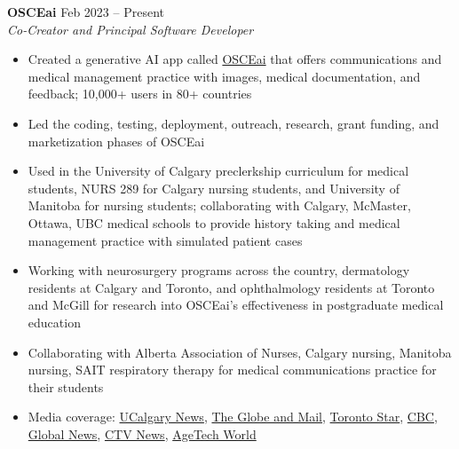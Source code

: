 \documentclass{article}
\begin{document}
\textbf{OSCEai} \hfill Feb 2023 -- Present \\
\textit{Co-Creator and Principal Software Developer}
\begin{itemize}
    \item Created a generative AI app called \href{https://osceai.ca/}{OSCEai} that offers communications and medical management practice with images, medical documentation, and feedback; 10,000+ users in 80+ countries
    \item Led the coding, testing, deployment, outreach, research, grant funding, and marketization phases of OSCEai
    \item Used in the University of Calgary preclerkship curriculum for medical students, NURS 289 for Calgary nursing students, and University of Manitoba for nursing students; collaborating with Calgary, McMaster, Ottawa, UBC medical schools to provide history taking and medical management practice with simulated patient cases
    \item Working with neurosurgery programs across the country, dermatology residents at Calgary and Toronto, and ophthalmology residents at Toronto and McGill for research into OSCEai's effectiveness in postgraduate medical education
    \item Collaborating with Alberta Association of Nurses, Calgary nursing, Manitoba nursing, SAIT respiratory therapy for medical communications practice for their students
    \item Media coverage: \href{https://cumming.ucalgary.ca/news/ucalgary-students-create-app-help-medical-students-learn-how-talk-patients}{UCalgary News}, \href{https://www.theglobeandmail.com/canada/alberta/article-new-app-uses-ai-to-help-calgary-medical-students-practise-interacting/}{The Globe and Mail}, \href{https://www.thestar.com/news/canada/new-app-uses-ai-to-help-calgary-medical-students-practise-interacting-with-patients/article_e24a869c-58f4-58ee-99ea-666e2bc65f27.amp.html}{Toronto Star}, \href{https://www.cbc.ca/amp/1.6975645}{CBC}, \href{https://globalnews.ca/news/9978614/new-app-uses-ai-medical-students-practise-interacting-patients/}{Global News}, \href{https://calgary.ctvnews.ca/new-app-uses-ai-to-help-calgary-medical-students-practise-interacting-with-patients-1.6573065?utm_source=ground.news&utm_medium=referral}{CTV News}, \href{https://agetechworld-co-uk.cdn.ampproject.org/c/s/agetechworld.co.uk/news/new-ai-app-could-hold-key-to-better-older-patient-doctor-communication/?amp=1}{AgeTech World}
\end{itemize} \vspace{1em}
\end{document}
